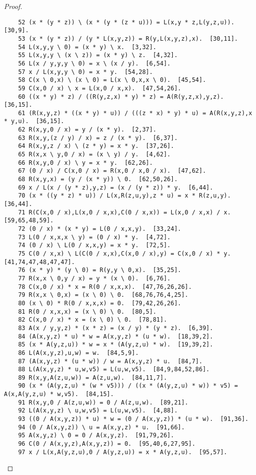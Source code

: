 \documentclass[12pt, twoside, openright]{report}
\theoremstyle{definition}
\begin{document}
\begin{proof}
\begin{lstlisting}
    52 (x * (y * z)) \ (x * (y * (z * u))) = L(x,y * z,L(y,z,u)).  [30,9].
    53 (x * (y * z)) / (y * L(x,y,z)) = R(y,L(x,y,z),x).  [30,11].
    54 L(x,y,y \ 0) = (x * y) \ x.  [3,32].
    55 L(x,y,y \ (x \ z)) = (x * y) \ z.  [4,32].
    56 L(x / y,y,y \ 0) = x \ (x / y).  [6,54].
    57 x / L(x,y,y \ 0) = x * y.  [54,28].
    58 C(x \ 0,x) \ (x \ 0) = L(x \ 0,x,x \ 0).  [45,54].
    59 C(x,0 / x) \ x = L(x,0 / x,x).  [47,54,26].
    60 ((x * y) * z) / ((R(y,z,x) * y) * z) = A(R(y,z,x),y,z).  [36,15].
    61 (R(x,y,z) * ((x * y) * u)) / (((z * x) * y) * u) = A(R(x,y,z),x * y,u).  [36,15].
    62 R(x,y,0 / x) = y / (x * y).  [2,37].
    63 R(x,y,(z / y) / x) = z / (x * y).  [6,37].
    64 R(x,y,z / x) \ (z * y) = x * y.  [37,26].
    65 R(x,x \ y,0 / x) = (x \ y) / y.  [4,62].
    66 R(x,y,0 / x) \ y = x * y.  [62,26].
    67 (0 / x) / C(x,0 / x) = R(x,0 / x,0 / x).  [47,62].
    68 R(x,y,x) = (y / (x * y)) \ 0.  [62,50,26].
    69 x / L(x / (y * z),y,z) = (x / (y * z)) * y.  [6,44].
    70 (x * ((y * z) * u)) / L(x,R(z,u,y),z * u) = x * R(z,u,y).  [36,44].
    71 R(C(x,0 / x),L(x,0 / x,x),C(0 / x,x)) = L(x,0 / x,x) / x.  [59,65,48,59].
    72 (0 / x) * (x * y) = L(0 / x,x,y).  [33,24].
    73 L(0 / x,x,x \ y) = (0 / x) * y.  [4,72].
    74 (0 / x) \ L(0 / x,x,y) = x * y.  [72,5].
    75 C(0 / x,x) \ L(C(0 / x,x),C(x,0 / x),y) = C(x,0 / x) * y.  [41,74,47,48,47,47].
    76 (x * y) * (y \ 0) = R(y,y \ 0,x).  [35,25].
    77 R(x,x \ 0,y / x) = y * (x \ 0).  [6,76].
    78 C(x,0 / x) * x = R(0 / x,x,x).  [47,76,26,26].
    79 R(x,x \ 0,x) = (x \ 0) \ 0.  [68,76,76,4,25].
    80 (x \ 0) * R(0 / x,x,x) = 0.  [79,42,26,26].
    81 R(0 / x,x,x) = (x \ 0) \ 0.  [80,5].
    82 C(x,0 / x) * x = (x \ 0) \ 0.  [78,81].
    83 A(x / y,y,z) * (x * z) = (x / y) * (y * z).  [6,39].
    84 (A(x,y,z) * u) * w = A(x,y,z) * (u * w).  [18,39,2].
    85 (x * A(y,z,u)) * w = x * (A(y,z,u) * w).  [19,39,2].
    86 L(A(x,y,z),u,w) = w.  [84,5,9].
    87 (A(x,y,z) * (u * w)) / w = A(x,y,z) * u.  [84,7].
    88 L(A(x,y,z) * u,w,v5) = L(u,w,v5).  [84,9,84,52,86].
    89 R(x,y,A(z,u,w)) = A(z,u,w).  [84,11,7].
    90 (x * (A(y,z,u) * (w * v5))) / ((x * (A(y,z,u) * w)) * v5) = A(x,A(y,z,u) * w,v5).  [84,15].
    91 R(x,y,0 / A(z,u,w)) = 0 / A(z,u,w).  [89,21].
    92 L(A(x,y,z) \ u,w,v5) = L(u,w,v5).  [4,88].
    93 ((0 / A(x,y,z)) * u) * w = (0 / A(x,y,z)) * (u * w).  [91,36].
    94 (0 / A(x,y,z)) \ u = A(x,y,z) * u.  [91,66].
    95 A(x,y,z) \ 0 = 0 / A(x,y,z).  [91,79,26].
    96 C(0 / A(x,y,z),A(x,y,z)) = 0.  [95,40,6,27,95].
    97 x / L(x,A(y,z,u),0 / A(y,z,u)) = x * A(y,z,u).  [95,57].

\end{lstlisting}
\end{proof}
\end{document}
